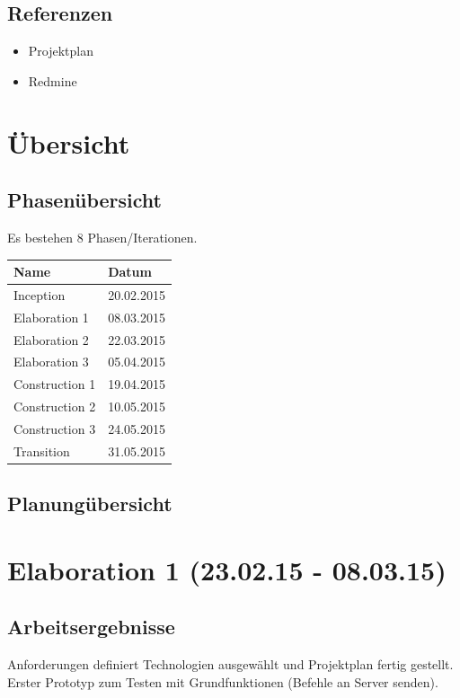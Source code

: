 \documentclass[11pt]{scrartcl}
\begin{document}
\subsection{Referenzen}
\begin{itemize}
  \item Projektplan
  \item Redmine
\end{itemize}
\section{Übersicht}
\subsection{Phasenübersicht}
Es bestehen 8 Phasen/Iterationen.
\newline
\begin{tabularx}{\linewidth}{X X}
  \bf{Name} & \bf{Datum} \\
  \hline
  Inception & 20.02.2015 \\
  Elaboration 1 & 08.03.2015 \\
  Elaboration 2 & 22.03.2015 \\
  Elaboration 3 & 05.04.2015 \\
  Construction 1 & 19.04.2015 \\
  Construction 2 & 10.05.2015 \\
  Construction 3 & 24.05.2015 \\
  Transition 	& 31.05.2015 \\
\end{tabularx}
\subsection{Planungübersicht}

\section{Elaboration 1 (23.02.15 - 08.03.15)}
\subsection{Arbeitsergebnisse}
Anforderungen definiert Technologien ausgewählt und Projektplan 
fertig gestellt. \newline Erster Prototyp 
zum Testen mit Grundfunktionen (Befehle an Server senden).
\end{document}
